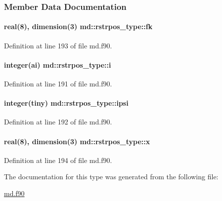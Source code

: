 \subsubsection{Member Data Documentation}
\hypertarget{structmd_1_1rstrpos__type_a1072a6523dc5b4c744ae6e10d9a43e06}{
\paragraph[{fk}]{\setlength{\rightskip}{0pt plus 5cm}real(8), dimension(3) md\-::rstrpos\-\_\-type\-::fk}}\label{structmd_1_1rstrpos__type_a1072a6523dc5b4c744ae6e10d9a43e06}


Definition at line 193 of file md.\-f90.

\hypertarget{structmd_1_1rstrpos__type_aaf42203273f6f02bd4d479b7da4b9b85}{
\paragraph[{i}]{\setlength{\rightskip}{0pt plus 5cm}integer(ai) md\-::rstrpos\-\_\-type\-::i}}\label{structmd_1_1rstrpos__type_aaf42203273f6f02bd4d479b7da4b9b85}


Definition at line 191 of file md.\-f90.

\hypertarget{structmd_1_1rstrpos__type_abf1d42acab9fbbcf48edd886adf98d70}{
\paragraph[{ipsi}]{\setlength{\rightskip}{0pt plus 5cm}integer(tiny) md\-::rstrpos\-\_\-type\-::ipsi}}\label{structmd_1_1rstrpos__type_abf1d42acab9fbbcf48edd886adf98d70}


Definition at line 192 of file md.\-f90.

\hypertarget{structmd_1_1rstrpos__type_add7f3d833aa2d66c2428451d057bfeda}{
\paragraph[{x}]{\setlength{\rightskip}{0pt plus 5cm}real(8), dimension(3) md\-::rstrpos\-\_\-type\-::x}}\label{structmd_1_1rstrpos__type_add7f3d833aa2d66c2428451d057bfeda}


Definition at line 194 of file md.\-f90.



The documentation for this type was generated from the following file\-:\begin{DoxyCompactItemize}
\item 
\hyperlink{md_8f90}{md.\-f90}\end{DoxyCompactItemize}
